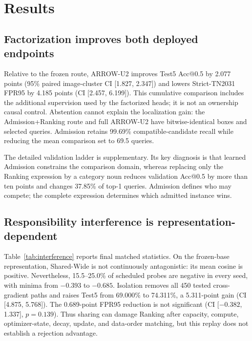 \section{Results}
\label{sec:results}



\subsection{Factorization improves both deployed endpoints}
Relative to the frozen route, ARROW-U2 improves Test5 Acc@0.5 by 2.077 points
(95\% paired image-cluster CI [1.827, 2.347]) and lowers Strict-TN2031 FPR95
by 4.185 points (CI [2.457, 6.199]).  This cumulative comparison includes the
additional supervision used by the factorized heads; it is not an ownership
causal control.  Abstention cannot explain the localization gain: the
Admission+Ranking route and full ARROW-U2 have bitwise-identical boxes and
selected queries.  Admission retains 99.69\% compatible-candidate recall while
reducing the mean comparison set to 69.5 queries.

The detailed validation ladder is supplementary.  Its key diagnosis is that
learned Admission constrains the comparison domain, whereas replacing only the
Ranking expression by a category noun reduces validation Acc@0.5 by more than
ten points and changes 37.85\% of top-1 queries.  Admission defines who may
compete; the complete expression determines which admitted instance wins.



\subsection{Responsibility interference is representation-dependent}
Table~\ref{tab:interference} reports final matched statistics.  On the
frozen-base representation, Shared-Wide is not continuously antagonistic: its
mean cosine is positive.  Nevertheless, 15.5--25.0\% of scheduled probes are
negative in every seed, with minima from $-0.393$ to $-0.685$.  Isolation
removes all 450 tested cross-gradient paths and raises Test5 from 69.000\% to
74.311\%, a 5.311-point gain (CI [4.875, 5.768]).  The 0.689-point FPR95
reduction is not significant (CI [$-0.382$, 1.337], $p=0.139$).  Thus sharing
can damage Ranking after capacity, compute, optimizer-state, decay, update, and
data-order matching, but this replay does not establish a rejection advantage.

